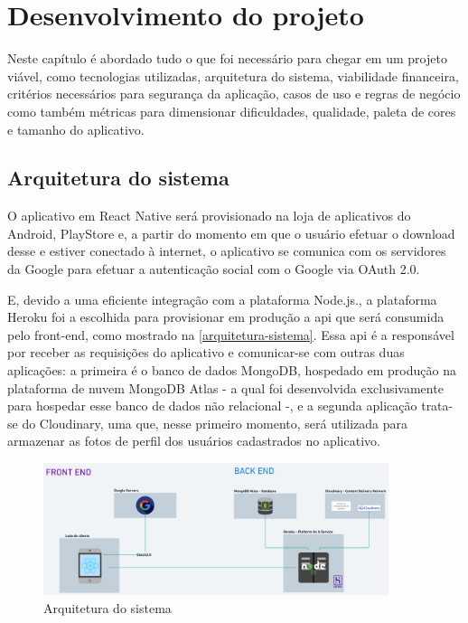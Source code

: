 \chapter{Desenvolvimento do projeto}

Neste capítulo é abordado tudo o que foi necessário para chegar em um projeto viável, como tecnologias utilizadas, arquitetura do sistema, viabilidade financeira, critérios necessários para segurança da aplicação, casos de uso e regras de negócio como também métricas para dimensionar dificuldades, qualidade, paleta de cores e tamanho do aplicativo.   



\section{Arquitetura do sistema}
O aplicativo em React Native será provisionado na loja de aplicativos do Android, PlayStore e, a partir do momento em que o usuário efetuar o download desse e estiver conectado à internet, o aplicativo se comunica com os servidores da Google para efetuar a autenticação social com o Google via OAuth 2.0. 

E, devido a uma eficiente integração com a plataforma Node.js., a plataforma Heroku foi a escolhida para provisionar em produção a \ac{api} que será consumida pelo front-end, como mostrado na \autoref{arquitetura-sistema}. Essa \ac{api} é a responsável por receber as requisições do aplicativo e comunicar-se com outras duas aplicações: a primeira é o banco de dados MongoDB, hospedado em produção na plataforma de nuvem MongoDB Atlas - a qual foi desenvolvida exclusivamente para hospedar esse banco de dados não relacional -, e a segunda aplicação trata-se do Cloudinary, uma  que, nesse primeiro momento, será utilizada para armazenar as fotos de perfil dos usuários cadastrados no aplicativo.


\begin{figure}[htb]
	\centering
	\caption{\label{fig_arq_virado}Arquitetura do sistema}
	\label{arquitetura-sistema}
	\includegraphics[width=0.9\textwidth]{anexos/poc-arquitetura.png}
\end{figure}


